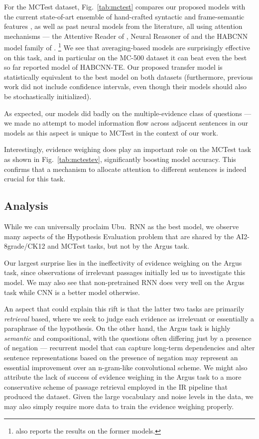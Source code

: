 \documentclass[11pt]{article}
\begin{document}
For the MCTest dataset,
Fig.~\ref{tab:mctest} compares our proposed models with the current state-of-art
ensemble of hand-crafted syntactic and frame-semantic features \cite{MCWang},
as well as past neural models
from the literature, all using attention mechanisms --- the Attentive Reader of \cite{ReadComprehend},
Neural Reasoner of \cite{NeuralReasoner} and the HABCNN model family of \cite{HABCNN}.%
\footnote{\cite{HABCNN} also reports the results on the former models.}
We see that averaging-based models are surprisingly effective on this task,
and in particular on the MC-500 dataset it can beat even the best so far reported model of HABCNN-TE.\@
Our proposed transfer model is statistically equivalent to the best model on both datasets
(furthermore, previous work did not include
confidence intervals, even though their models should also be stochastically initialized).

As expected, our models did badly on the multiple-evidence class of questions
--- we made no attempt to model information flow across adjacent sentences in our
models as this aspect is unique to MCTest in the
context of our work.


Interestingly, evidence weighing does play an important role on the MCTest task
as shown in Fig.~\ref{tab:mctestev},
significantly boosting model accuracy.
This confirms that a mechanism to allocate attention to different sentences
is indeed crucial for this task.

\subsection{Analysis}

While we can universally proclaim Ubu.\ RNN as the best model,
we observe many aspects of the Hypothesis Evaluation problem that are shared
by the AI2-8grade/CK12 and MCTest tasks, but not by the Argus task.

Our largest surprise lies in the ineffectivity of evidence weighing
on the Argus task, since observations of irrelevant passages initially
led us to investigate this model.  %
We may also see that non-pretrained RNN does very well on the Argus task
while CNN is a better model otherwise.

An aspect that could explain this rift is that the latter two tasks
are primarily \textit{retrieval} based, where we seek to judge each
evidence as irrelevant or essentially a paraphrase of the hypothesis.
On the other hand, the Argus task is highly \textit{semantic}
and compositional, with the questions often differing just by a presence
of negation --- recurrent model that can capture long-term dependencies
and alter sentence representations based on the presence of negation
may represent an essential improvement over an n-gram-like convolutional
scheme.
We might also attribute the lack of success of evidence weighing in the Argus task
to a more conservative scheme of passage retrieval employed
in the IR pipeline that produced the dataset.
Given the large vocabulary and noise levels in the data, we may also simply
require more data to train the evidence weighing properly.
\end{document}
